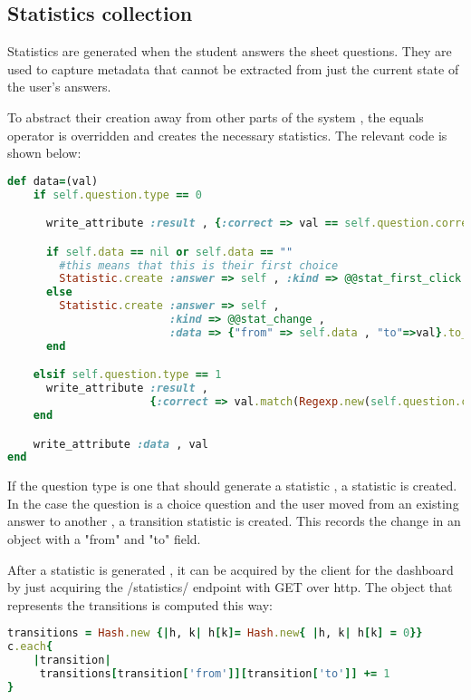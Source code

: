 \subsection{Statistics collection}
Statistics are generated when the student answers the sheet questions. They are used to capture metadata that cannot be extracted from just the current state of the user's answers.

To abstract their creation away from other parts of the system , the equals operator is overridden and creates the necessary statistics. The relevant code is shown below:


\begin{lstlisting}[breaklines,language=Ruby,frame=single,basicstyle=\ttfamily,
    stringstyle=\color{red},
    keywordstyle=\color{blue}]
def data=(val)
    if self.question.type == 0

      write_attribute :result , {:correct => val == self.question.correct_answer}.to_json

      if self.data == nil or self.data == ""
        #this means that this is their first choice
        Statistic.create :answer => self , :kind => @@stat_first_click , :data => val
      else
        Statistic.create :answer => self ,
                         :kind => @@stat_change ,
                         :data => {"from" => self.data , "to"=>val}.to_json.to_s
      end

    elsif self.question.type == 1
      write_attribute :result ,
                      {:correct => val.match(Regexp.new(self.question.correct_answer)) != nil}.to_json
    end

    write_attribute :data , val
end
\end{lstlisting}

If the question type is one that should generate a statistic , a statistic is created. In the case the question is a choice question and the user moved from an existing answer to another , a transition statistic is created. This records the change in an object with a "from" and "to" field.

After a statistic is generated , it can be acquired by the client for the dashboard by just acquiring the /statistics/ endpoint with GET over http. The object that represents the transitions is computed this way:

\begin{lstlisting}[breaklines,language=Ruby,frame=single,basicstyle=\ttfamily,
    stringstyle=\color{red},
    keywordstyle=\color{blue}]
transitions = Hash.new {|h, k| h[k]= Hash.new{ |h, k| h[k] = 0}}
c.each{
    |transition|
	 transitions[transition['from']][transition['to']] += 1
}
\end{lstlisting}

